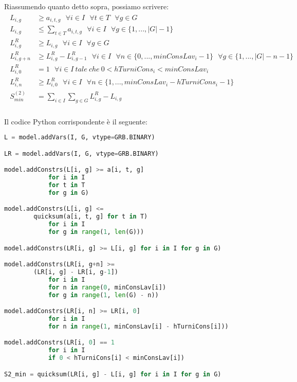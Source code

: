 Riassumendo quanto detto sopra, possiamo scrivere:
\begin{gather}
\begin{aligned}
L_{i, g} &\geq a_{i, t, g} ~~~ \forall i \in I ~~~ \forall t \in T ~~~ \forall g \in G \\
L_{i, g} &\leq \sum_{t \in T} a_{i, t, g} ~~~ \forall i \in I ~~~ \forall g \in \{1,...,|G| - 1\} \\
L_{i, g}^R &\geq L_{i, g} ~~~ \forall i \in I ~~~ \forall g \in G \\
L_{i, g+n}^R &\geq L_{i, g}^R - L_{i, g-1}^R ~~~ \forall i \in I ~~~ \forall n \in \{0,...,minConsLav_i - 1\} ~~~ \forall g \in \{1,...,|G| - n - 1\} \\
L_{i, 0}^R &= 1 ~~~ \forall i \in I ~ tale ~ che ~ 0 < hTurniCons_i < minConsLav_i \\
L_{i, n}^R &\geq L_{i, 0}^R ~~~ \forall i \in I ~~~ \forall n \in \{1,...,minConsLav_i - hTurniCons_i - 1\} \\
S^{(2)}_{min} &= \sum_{i \in I} \sum_{g \in G} L_{i, g}^R - L_{i, g} \\
\end{aligned}
\end{gather}

 
Il codice Python corrispondente è il seguente:
\begin{lstlisting}[language=Python]
L = model.addVars(I, G, vtype=GRB.BINARY)

LR = model.addVars(I, G, vtype=GRB.BINARY)

model.addConstrs(L[i, g] >= a[i, t, g]
            for i in I
            for t in T
            for g in G)

model.addConstrs(L[i, g] <= 
		quicksum(a[i, t, g] for t in T)
            for i in I
            for g in range(1, len(G)))

model.addConstrs(LR[i, g] >= L[i, g] for i in I for g in G)

model.addConstrs(LR[i, g+n] >= 
		(LR[i, g] - LR[i, g-1])
            for i in I
            for n in range(0, minConsLav[i])
            for g in range(1, len(G) - n))

model.addConstrs(LR[i, n] >= LR[i, 0]
            for i in I
            for n in range(1, minConsLav[i] - hTurniCons[i]))

model.addConstrs(LR[i, 0] == 1
            for i in I
            if 0 < hTurniCons[i] < minConsLav[i])

S2_min = quicksum(LR[i, g] - L[i, g] for i in I for g in G)

\end{lstlisting}

